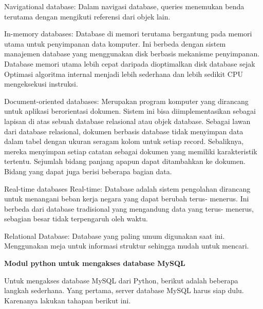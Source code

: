 \documentclass{wileySix}
\begin{document}
\begin{myEnumerate}
	\noindent 
	\item Navigational database: Dalam navigasi database, queries menemukan benda terutama dengan mengikuti referensi dari objek lain. \par
	\noindent 
	\item In-memory databases: Database di memori terutama bergantung pada memori utama untuk penyimpanan data komputer. Ini berbeda dengan sistem manajemen database yang menggunakan disk berbasis mekanisme penyimpanan. Database memori utama lebih cepat daripada dioptimalkan disk database sejak Optimasi algoritma internal menjadi lebih sederhana dan lebih sedikit CPU mengeksekusi instruksi. \par
	\noindent 
	\item Document-oriented databases: Merupakan program komputer yang dirancang untuk aplikasi berorientasi dokumen. Sistem ini bisa diimplementasikan sebagai lapisan di atas sebuah database relasional atau objek database. Sebagai lawan dari database relasional, dokumen berbasis database tidak menyimpan data dalam tabel dengan ukuran seragam kolom untuk setiap record. Sebaliknya, mereka menyimpan setiap catatan sebagai dokumen yang memiliki karakteristik tertentu. Sejumlah bidang panjang apapun dapat ditambahkan ke dokumen. Bidang yang dapat juga berisi beberapa bagian data. \par
	\noindent 
	\item Real-time databases Real-time: Database adalah sistem pengolahan dirancang untuk menangani beban kerja negara yang dapat berubah terus- menerus. Ini berbeda dari database tradisional yang mengandung data yang terus- menerus, sebagian besar tidak terpengaruh oleh waktu. \par
	\noindent 
	\item Relational Database: Database yang paling umum digunakan saat ini. Menggunakan meja untuk informasi struktur sehingga mudah untuk mencari.\end{myEnumerate}
\par
\vspace{12pt}
\noindent 
\textbf{Modul python}\textbf{ untuk mengakses database MySQL} \par
Untuk mengakses database MySQL dari Python, berikut adalah beberapa langkah sederhana. Yang pertama, server database MySQL harus siap dulu. Karenanya lakukan tahapan berikut ini. \par
\noindent 
\end{document}
